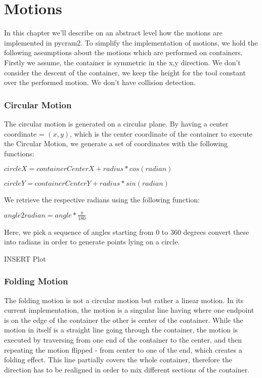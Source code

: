 \chapter*{Motions}
\label{chap:Motions}

In this chapter we'll describe on an abstract level how the motions are implemented in pycram2.
To simplify the implementation of motions, we hold the following assumptions about the motions which are performed on containers.
Firstly we assume, the container is symmetric in the x,y direction. We don't consider the descent of the container, we keep the height for the tool
constant over the performed motion. We don't have collision detection.

\subsection*{Circular Motion}
The circular motion is generated on a circular plane. 
By having a center coordinate = $(x,y)$, which is the center coordinate of 
the container to execute the Circular Motion, we generate a set of coordinates
with the following functions: 

$circleX = containerCenterX + radius * cos(radian)$

$circleY = containerCenterY + radius * sin(radian)$

We retrieve the respective radians using the following function:

$ angle2radian = angle * \frac{\pi}{180} $

Here, we pick a sequence of angles starting from
0 to 360 degrees convert these into radians in order to generate points lying on a circle.

INSERT Plot

\subsection{Folding Motion}
The folding motion is not a circular motion but rather a linear motion. In its current implementation, the motion is a singular line having where one endpoint is on the edge of the container
the other is center of the container. While the motion in itself is a straight line going through the container, the motion is executed by traversing from one end of the container to the center,
and then repeating the motion flipped - from center to one of the end, which creates a folding effect.
This line partially covers the whole container, therefore the direction has to be realigned in order to mix different sections of the container.

